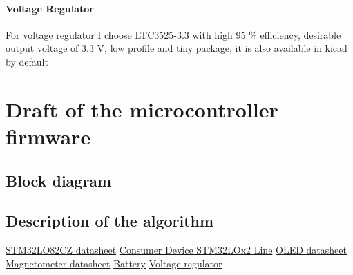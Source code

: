 \documentclass{article}
\begin{document}
\paragraph{Voltage Regulator} For voltage regulator I choose LTC3525-3.3 with high 95 \%
efficiency, desirable output voltage of 3.3 V, low profile and tiny package, it
is also available in kicad by default \cite{Voltage Regulator}
\section{Draft of the microcontroller firmware}
\subsection{Block diagram}
\subsection{Description of the algorithm}
\begin{thebibliography}{9}
	\href{https://www.st.com/resource/en/datasheet/stm32l082cz.pdf}{STM32LO82CZ
	datasheet}
	\href{https://www.st.com/en/microcontrollers-microprocessors/stm32l0-series.html}{Consumer
	Device STM32LOx2 Line}
	\href{https://www.mouser.pl/datasheet/2/291/NHD_2_7_12864WDY3-1116258.pdf}{OLED
	datasheet}
	\href{https://cdn-shop.adafruit.com/datasheets/HMC5883L_3-Axis_Digital_Compass_IC.pdf}{Magnetometer
	datasheet}
	\href{https://www.murata.com/products/productdata/8809693839390/LR44R-DATASHEET.pdf?1604287808000}{Battery}
	\href{https://www.analog.com/media/en/technical-documentation/data-sheets/3525fc.pdf}{Voltage
	regulator} 
\end{thebibliography}
\end{document}
